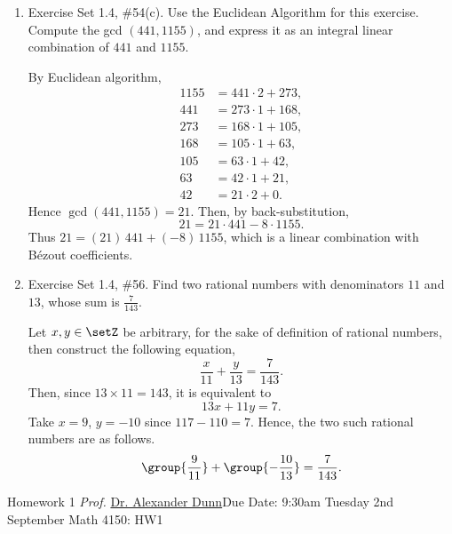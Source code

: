 \begin{enumerate}
  \item Exercise Set 1.4, \#54(c). Use the Euclidean Algorithm for this exercise. Compute the 
  gcd $(441,1155)$, and express it as an integral linear combination of $441$ and $1155$.
  \begin{subanswer}
    By Euclidean algorithm,
    \[
      \begin{aligned}
        1155 &= 441\cdot 2 + 273,\\
        441 &= 273\cdot 1 + 168,\\
        273 &= 168\cdot 1 + 105,\\
        168 &= 105\cdot 1 + 63,\\
        105 &= 63\cdot 1 + 42,\\
        63  &= 42\cdot 1 + 21,\\
        42  &= 21\cdot 2 + 0.
      \end{aligned}
    \]
    Hence $\gcd(441,1155)=21$. Then, by back-substitution,
    \[
      21 = 21\cdot 441 - 8\cdot 1155.
    \]
    Thus $21 = (21)\,441 + (-8)\,1155$, which is a linear combination with Bézout coefficients.
  \end{subanswer}


  \item Exercise Set 1.4, \#56. Find two rational numbers with denominators $11$ and $13$, whose 
  sum is $\frac{7}{143}$.
  \begin{subanswer}
    Let $x,y\in\setZ$ be arbitrary, for the sake of definition of rational numbers, then construct 
    the following equation,
    $$\dfrac{x}{11}+\dfrac{y}{13}=\dfrac{7}{143}.$$
    Then, since $13\times11=143$, it is equivalent to 
    $$13x+11y=7.$$ 
    Take $x=9$, $y=-10$ since $117-110=7$. Hence, the two such rational numbers are as follows.
    \[
      \group{\frac{9}{11}}+\group{-\frac{10}{13}}=\frac{7}{143}.
    \]
  \end{subanswer}
\end{enumerate}









\newpage{}
{Homework 1}
{\textit{Prof.} \href{https://alexjdunn.weebly.com/}{Dr. Alexander Dunn}}{Due Date: 9:30am Tuesday 2nd September}
{Math 4150: HW1}


\newpage


